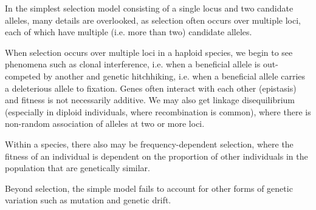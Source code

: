 In the simplest selection model consisting of a single locus and two candidate alleles, many details are overlooked, as selection often occurs over multiple loci, each of which have multiple (i.e. more than two) candidate alleles.

When selection occurs over multiple loci in a haploid species, we begin to see phenomena such as clonal interference, i.e. when a beneficial allele is out-competed by another and genetic hitchhiking, i.e. when a beneficial allele carries a deleterious allele to fixation. Genes often interact with each other (epistasis) and fitness is not necessarily additive. We may also get linkage disequilibrium (especially in diploid individuals, where recombination is common), where there is non-random association of alleles at two or more loci.

Within a species, there also may be frequency-dependent selection, where the fitness of an individual is dependent on the proportion of other individuals in the population that are genetically similar.

Beyond selection, the simple model fails to account for other forms of genetic variation such as mutation and genetic drift.
